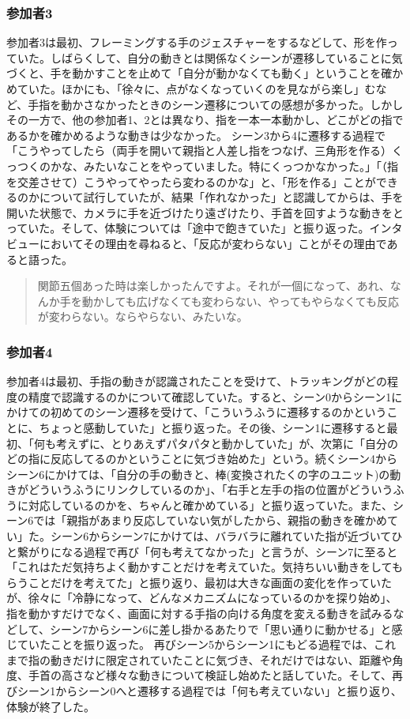 \subsubsection*{参加者3}
参加者3は最初、フレーミングする手のジェスチャーをするなどして、形を作っていた。しばらくして、自分の動きとは関係なくシーンが遷移していることに気づくと、手を動かすことを止めて「自分が動かなくても動く」ということを確かめていた。ほかにも、「徐々に、点がなくなっていくのを見ながら楽し」むなど、手指を動かさなかったときのシーン遷移についての感想が多かった。しかしその一方で、他の参加者1、2とは異なり、指を一本一本動かし、どこがどの指であるかを確かめるような動きは少なかった。
シーン3から4に遷移する過程で「こうやってしたら（両手を開いて親指と人差し指をつなげ、三角形を作る）くっつくのかな、みたいなことをやっていました。特にくっつかなかった。」「（指を交差させて）こうやってやったら変わるのかな」と、「形を作る」ことができるのかについて試行していたが、結果「作れなかった」と認識してからは、手を開いた状態で、カメラに手を近づけたり遠ざけたり、手首を回すような動きをとっていた。そして、体験については「途中で飽きていた」と振り返った。インタビューにおいてその理由を尋ねると、「反応が変わらない」ことがその理由であると語った。
\begin{quote}
  関節五個あった時は楽しかったんですよ。それが一個になって、あれ、なんか手を動かしても広げなくても変わらない、やってもやらなくても反応が変わらない。ならやらない、みたいな。  
\end{quote}

\subsubsection*{参加者4}
参加者4は最初、手指の動きが認識されたことを受けて、トラッキングがどの程度の精度で認識するのかについて確認していた。すると、シーン0からシーン1にかけての初めてのシーン遷移を受けて、「こういうふうに遷移するのかということに、ちょっと感動していた」と振り返った。その後、シーン1に遷移すると最初、「何も考えずに、とりあえずパタパタと動かしていた」が、次第に「自分のどの指に反応してるのかということに気づき始めた」という。続くシーン4からシーン6にかけては、「自分の手の動きと、棒(変換されたくの字のユニット)の動きがどういうふうにリンクしているのか」、「右手と左手の指の位置がどういうふうに対応しているのかを、ちゃんと確かめている」と振り返っていた。また、シーン6では「親指があまり反応していない気がしたから、親指の動きを確かめてい」た。シーン6からシーン7にかけては、バラバラに離れていた指が近づいてひと繋がりになる過程で再び「何も考えてなかった」と言うが、シーン7に至ると「これはただ気持ちよく動かすことだけを考えていた。気持ちいい動きをしてもらうことだけを考えてた」と振り返り、最初は大きな画面の変化を作っていたが、徐々に「冷静になって、どんなメカニズムになっているのかを探り始め」、指を動かすだけでなく、画面に対する手指の向ける角度を変える動きを試みるなどして、シーン7からシーン6に差し掛かるあたりで「思い通りに動かせる」と感じていたことを振り返った。
再びシーン5からシーン1にもどる過程では、これまで指の動きだけに限定されていたことに気づき、それだけではない、距離や角度、手首の高さなど様々な動きについて検証し始めたと話していた。そして、再びシーン1からシーン0へと遷移する過程では「何も考えていない」と振り返り、体験が終了した。

